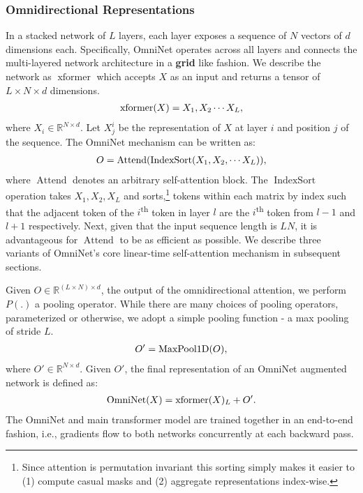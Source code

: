 \documentclass{article}
\DeclareMathOperator{\att}{Attend}
\DeclareMathOperator{\omni}{OmniNet}
\DeclareMathOperator{\maxpool}{MaxPool1D}
\DeclareMathOperator{\transformer}{xformer}
\DeclareMathOperator{\indexsort}{IndexSort}
\begin{document}
\subsubsection{Omnidirectional Representations}
\label{sec:omni_rep}
In a stacked network of $L$ layers, each layer exposes a sequence of $N$ vectors of $d$ dimensions each. Specifically, OmniNet operates across all layers and connects the multi-layered network architecture in a \textbf{grid} like fashion. We describe the network as $\transformer$ which accepts $X$ as an input and returns a tensor of $L \times N \times d$ dimensions.
\begin{align}
\vspace{-5pt}
\transformer(X) = X_{1}, X_2 \cdots X_{L},   
\vspace{-5pt}
\end{align}
where $X_i \in \mathbb{R}^{N \times d}$. Let $X^{i}_{j}$ be the representation of $X$ at layer $i$ and position $j$ of the sequence. The OmniNet mechanism can be written as:
\begin{align}
\vspace{-5pt}
O = \att(\indexsort(X_{1}, X_2, \cdots X_{L} )),
\vspace{-5pt}
\end{align}
where $\att$ denotes an arbitrary self-attention block. The $\indexsort$ operation takes $X_1, X_2, X_L$ and sorts,\footnote{Since attention is permutation invariant this sorting simply makes it easier to (1) compute casual masks and (2) aggregate representations index-wise.} tokens within each matrix by index such that the adjacent token of the $i$\textsuperscript{th} token in layer $l$ are the $i$\textsuperscript{th} token from $l-1$ and $l+1$ respectively. 
Next, given that the input sequence length is $LN$, it is advantageous for $\att$ to be as efficient as possible. We describe three variants of OmniNet's core linear-time self-attention mechanism in subsequent sections. 

Given $O \in \mathbb{R}^{(L \times N) \times d}$, the output of the omnidirectional attention, we perform $P(.)$ a pooling operator. While there are many choices of pooling operators, parameterized or otherwise, we adopt a simple pooling function - a max pooling of stride $L$.
\begin{align}
\vspace{-5pt}
O' = \maxpool(O), 
\vspace{-5pt}
\end{align}
where $O' \in \mathbb{R}^{N \times d}$. Given $O'$, the final representation of an OmniNet augmented network is defined as:
\begin{align}
\vspace{-5pt}
\omni(X) = \transformer(X)_{L} + O'.  
\vspace{-5pt}
\end{align}
The OmniNet and main transformer model are trained together in an end-to-end fashion, i.e., gradients flow to both networks concurrently at each backward pass. 
\end{document}
